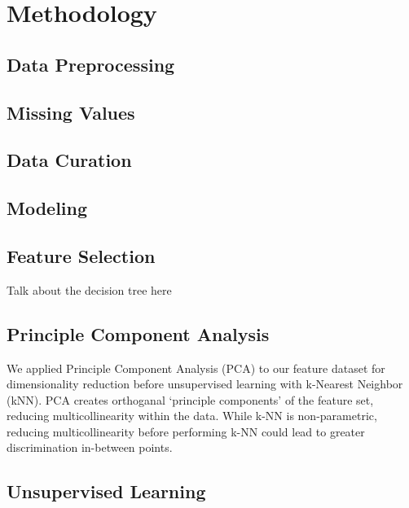 \documentclass[11pt,]{article}
\begin{document}
\hypertarget{methodology}{%
\section{Methodology}\label{methodology}}

\hypertarget{data-preprocessing}{%
\subsection{Data Preprocessing}\label{data-preprocessing}}

\hypertarget{missing-values}{%
\subsection{Missing Values}\label{missing-values}}

\hypertarget{data-curation}{%
\subsection{Data Curation}\label{data-curation}}

\hypertarget{modeling}{%
\subsection{Modeling}\label{modeling}}

\hypertarget{feature-selection}{%
\subsection{Feature Selection}\label{feature-selection}}

Talk about the decision tree here

\hypertarget{principle-component-analysis}{%
\subsection{Principle Component
Analysis}\label{principle-component-analysis}}

We applied Principle Component Analysis (PCA) to our feature dataset for
dimensionality reduction before unsupervised learning with k-Nearest
Neighbor (kNN). PCA creates orthoganal `principle components' of the
feature set, reducing multicollinearity within the data. While k-NN is
non-parametric, reducing multicollinearity before performing k-NN could
lead to greater discrimination in-between points.

\hypertarget{unsupervised-learning}{%
\subsection{Unsupervised Learning}\label{unsupervised-learning}}
\end{document}
